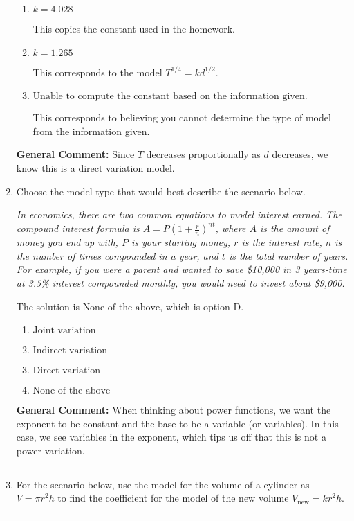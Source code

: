 \documentclass{extbook}[14pt]
\newcommand{\litem}[1]{\item #1

\rule{\textwidth}{0.4pt}}
\begin{document}
\begin{enumerate}
{\begin{enumerate}[label=\Alph*.]
* This is the correct option corresponding to the model $T^{4} = k d^{2}$.
\item \( k = 4.028 \)

This copies the constant used in the homework.
\item \( k = 1.265 \)

This corresponds to the model $T^{1/4} = k d^{1/2}$.
\item \( \text{Unable to compute the constant based on the information given.} \)

This corresponds to believing you cannot determine the type of model from the information given.
\end{enumerate}

\textbf{General Comment:} Since $T$ decreases proportionally as $d$ decreases, we know this is a direct variation model.
}
\litem{
Choose the model type that would best describe the scenario below.

\begin{center}
    \textit{ In economics, there are two common equations to model interest earned. The compound interest formula is $A = P (1 + \frac{r}{n})^{nt}$, where $A$ is the amount of money you end up with, $P$ is your starting money, $r$ is the interest rate, $n$ is the number of times compounded in a year, and $t$ is the total number of years. For example, if you were a parent and wanted to save \$10,000 in 3 years-time at 3.5\% interest compounded monthly, you would need to invest about \$9,000. }
\end{center}
The solution is \( \text{None of the above} \), which is option D.\begin{enumerate}[label=\Alph*.]
\item \( \text{Joint variation} \)


\item \( \text{Indirect variation} \)


\item \( \text{Direct variation} \)


\item \( \text{None of the above} \)


\end{enumerate}

\textbf{General Comment:} When thinking about power functions, we want the exponent to be constant and the base to be a variable (or variables). In this case, we see variables in the exponent, which tips us off that this is not a power variation.
}
\litem{
For the scenario below, use the model for the volume of a cylinder as $V = \pi r^2 h$ to find the coefficient for the model of the new volume $V_{\text{new}} = k r^2 h$.

}
\end{enumerate}
\end{document}
